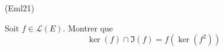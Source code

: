 \begin{tiny}(Eml21)\end{tiny} Soit $f\in \mathcal{L}(E)$. Montrer que
\begin{displaymath}
  \ker(f) \cap \Im(f) = f\left( \ker(f^2)\right) 
\end{displaymath}
